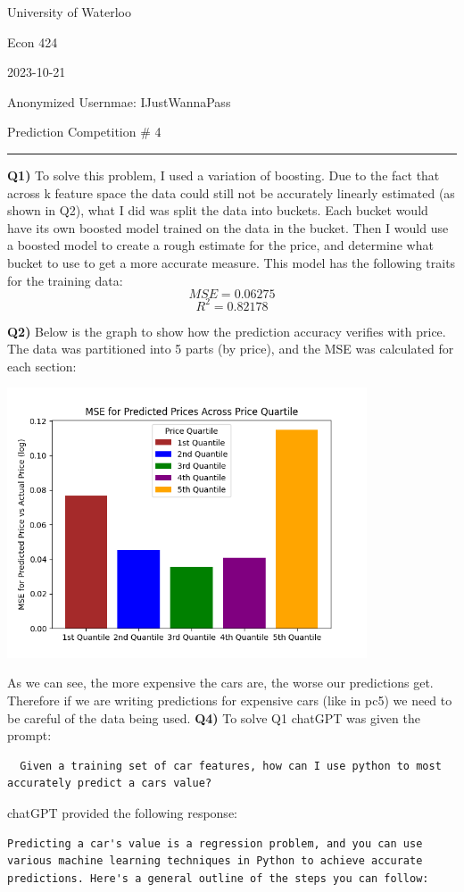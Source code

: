 \documentclass{article}
\begin{document}
\begin{titlepage}
	\setlength{\parindent}{0pt}
	\large

\vspace*{-2cm}

University of Waterloo \par
Econ 424 \par
2023-10-21 \par
\vspace{0.05cm}
Anonymized Usernmae: IJustWannaPass
\vspace{0.2cm}

{\huge Prediction Competition \# 4 \par}
\hrule

\vspace{1cm}
\textbf{Q1)} To solve this problem, I used a variation of boosting. Due to the fact that across k feature space the data could still not be accurately linearly estimated (as shown in Q2), what I did was split the data into buckets. Each bucket would have its own boosted model trained on the data in the bucket. Then I would use a boosted model to create a rough estimate for the price, and determine what bucket to use to get a more accurate measure. This model has the following traits for the training data:
\[ MSE = 0.06275 \]
\[ R^2 = 0.82178 \]

\textbf{Q2)} Below is the graph to show how the prediction accuracy verifies with price. The data was partitioned into 5 parts (by price), and the MSE was calculated for each section:
\begin{center}
\includegraphics[width=0.8\textwidth]{g4.png}
\end{center}
As we can see, the more expensive the cars are, the worse our predictions get. Therefore if we are writing predictions for expensive cars (like in pc5) we need to be careful of the data being used.
\newpage
\textbf{Q4)} To solve Q1 chatGPT was given the prompt: 
\begin{verbatim}
  Given a training set of car features, how can I use python to most accurately predict a cars value?
\end{verbatim}
chatGPT provided the following response:
\begin{verbatim}
Predicting a car's value is a regression problem, and you can use various machine learning techniques in Python to achieve accurate predictions. Here's a general outline of the steps you can follow:


\end{verbatim}
\end{titlepage}
\end{document}
